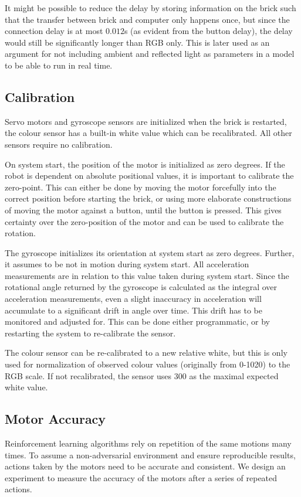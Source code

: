 \documentclass[11pt, a4paper]{article}
\begin{document}
	It might be possible to reduce the delay by storing information on the brick such that the transfer between brick and computer only happens once, but since the connection delay is at most $0.012$s (as evident from the button delay), the delay would still be significantly longer than RGB only. This is later used as an argument for not including ambient and reflected light as parameters in a model to be able to run in real time.
	
	\subsection{Calibration} \label{calibration}
	Servo motors and gyroscope sensors are initialized when the brick is restarted, the colour sensor has a built-in white value which can be recalibrated. All other sensors require no calibration.
	
	On system start, the position of the motor is initialized as zero degrees. If the robot is dependent on absolute positional values, it is important to calibrate the zero-point. This can either be done by moving the motor forcefully into the correct position before starting the brick, or using more elaborate constructions of moving the motor against a button, until the button is pressed. This gives certainty over the zero-position of the motor and can be used to calibrate the rotation.
	
	The gyroscope initializes its orientation at system start as zero degrees. Further, it assumes to be not in motion during system start. All acceleration measurements are in relation to this value taken during system start. Since the rotational angle returned by the gyroscope is calculated as the integral over acceleration measurements, even a slight inaccuracy in acceleration will accumulate to a significant drift in angle over time. This drift has to be monitored and adjusted for. This can be done either programmatic, or by restarting the system to re-calibrate the sensor.
	
	The colour sensor can be re-calibrated to a new relative white, but this is only used for normalization of observed colour values (originally from 0-1020) to the RGB scale. If not recalibrated, the sensor uses 300 as the maximal expected white value.
	
	
	\subsection{Motor Accuracy}
	Reinforcement learning algorithms rely on repetition of the same motions many times. To assume a non-adversarial environment and ensure reproducible results, actions taken by the motors need to be accurate and consistent. We design an experiment to measure the accuracy of the motors after a series of repeated actions.
	
\end{document}
